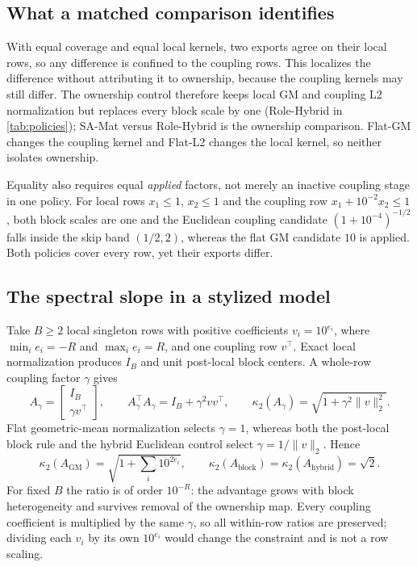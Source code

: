 \subsection{What a matched comparison identifies}

With equal coverage and equal local kernels, two exports agree on their local rows, so any
difference is confined to the coupling rows. This localizes the difference without
attributing it to ownership, because the coupling kernels may still differ. The ownership
control therefore keeps local GM and coupling L2 normalization but replaces every block
scale by one (Role-Hybrid in \cref{tab:policies}); SA-Mat versus Role-Hybrid is the
ownership comparison. Flat-GM changes the coupling kernel and Flat-L2 changes the local
kernel, so neither isolates ownership.

Equality also requires equal \emph{applied} factors, not merely an inactive coupling stage in
one policy. For local rows $x_1\leq1$, $x_2\leq1$ and the coupling row
$x_1+10^{-2}x_2\leq1$, both block scales are one and the Euclidean coupling candidate
$(1+10^{-4})^{-1/2}$ falls inside the skip band $(1/2,2)$, whereas the flat GM candidate
$10$ is applied. Both policies cover every row, yet their exports differ.

\subsection{The spectral slope in a stylized model}

Take $B\geq2$ local singleton rows with positive coefficients $v_i=10^{e_i}$,
where $\min_i e_i=-R$ and $\max_i e_i=R$, and one coupling row $v^\top$.
Exact local normalization produces $I_B$ and unit post-local block centers. A
whole-row coupling factor $\gamma$ gives
\[
 A_\gamma=\begin{bmatrix}I_B\\\gamma v^\top\end{bmatrix},
 \qquad A_\gamma^\top A_\gamma=I_B+\gamma^2vv^\top,
 \qquad
 \kappa_2(A_\gamma)=\sqrt{1+\gamma^2\|v\|_2^2}.
\]
Flat geometric-mean normalization selects $\gamma=1$, whereas both the post-local block
rule and the hybrid Euclidean control select $\gamma=1/\|v\|_2$. Hence
\[
 \kappa_2(A_{\mathrm{GM}})=\sqrt{1+\sum_i10^{2e_i}},
 \qquad
 \kappa_2(A_{\mathrm{block}})=\kappa_2(A_{\mathrm{hybrid}})=\sqrt2.
\]
For fixed $B$ the ratio is of order $10^{-R}$: the advantage grows with block heterogeneity
and survives removal of the ownership map. Every coupling coefficient is multiplied by the
same $\gamma$, so all within-row ratios are preserved; dividing each $v_i$ by its own
$10^{e_i}$ would change the constraint and is not a row scaling.

